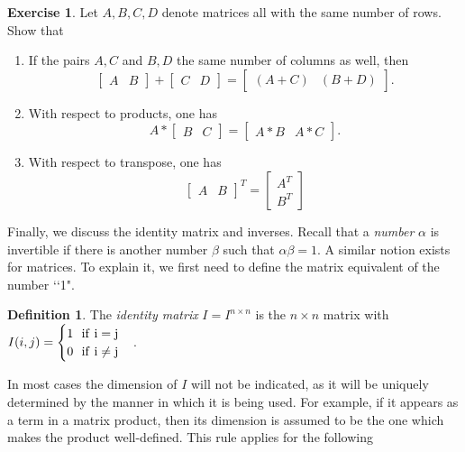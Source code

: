 \documentclass[11pt,notitlepage]{article}
\numberwithin{equation}{section}
\theoremstyle{plain}
\theoremstyle{definition}
\newtheorem{definition}[equation]{Definition}
\newtheorem{exercise}[equation]{Exercise}
\begin{document}
\begin{exercise} Let $A, B, C, D$ denote matrices all with the same number of rows. Show that
\begin{enumerate}
\item If the pairs $A,C$ and $B,D$ the same number of columns as well, then
\[
\begin{bmatrix} A & B\end{bmatrix} + \begin{bmatrix} C & D\end{bmatrix} = \begin{bmatrix} (A+C) & (B+D)\end{bmatrix}.
\]
\item With respect to products, one has
\[
A*\begin{bmatrix} B & C\end{bmatrix} = \begin{bmatrix} A*B & A*C\end{bmatrix}.
\]
\item With respect to transpose, one has
\[
\begin{bmatrix} A & B\end{bmatrix}^T = \begin{bmatrix} A^T \\ B^T\end{bmatrix}
\]
\end{enumerate}
\end{exercise}

Finally, we discuss the identity matrix and inverses. Recall that a {\it number} $\alpha$ is invertible if there is another number $\beta$ such that $\alpha\beta = 1$. A similar notion exists for matrices. To explain it, we first need to define the matrix equivalent of the number \lq\lq 1".

\begin{definition} The {\it identity matrix} $I = I^{n\times n}$ is the $n\times n$ matrix with $I(i,j) = \begin{cases}1\ \ \rm{if}\ i=j\\0\ \ \rm{if}\ i\ne j\end{cases}$.
\end{definition}

In most cases the dimension of $I$ will not be indicated, as it will be uniquely determined by the manner in which it is being used. For example, if it appears as a term in a matrix product, then its dimension is assumed to be the one which makes the product well-defined. This rule applies for the following 
\end{document}

